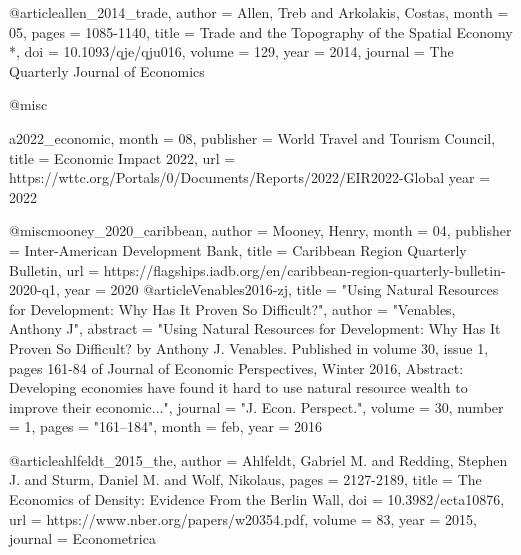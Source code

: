 @article{allen_2014_trade,
	author = {Allen, Treb and Arkolakis, Costas},
	month = {05},
	pages = {1085-1140},
	title = {Trade and the Topography of the Spatial Economy
		*},
	doi = {10.1093/qje/qju016},
	volume = {129},
	year = {2014},
	journal = {The Quarterly Journal of Economics}
}

@misc{a2022_economic,
	month = {08},
	publisher = {World Travel and Tourism Council},
	title = {Economic Impact 2022},
	url = {https://wttc.org/Portals/0/Documents/Reports/2022/EIR2022-Global%
	year = {2022}
}

@misc{mooney_2020_caribbean,
	author = {Mooney, Henry},
	month = {04},
	publisher = {Inter-American Development Bank},
	title = {Caribbean Region Quarterly Bulletin},
	url = {https://flagships.iadb.org/en/caribbean-region-quarterly-bulletin-2020-q1},
	year = {2020}
}
@article{Venables2016-zj,
	title    = "Using Natural Resources for Development: Why Has It Proven So
	Difficult?",
	author   = "Venables, Anthony J",
	abstract = "Using Natural Resources for Development: Why Has It Proven So
	Difficult? by Anthony J. Venables. Published in volume 30, issue
	1, pages 161-84 of Journal of Economic Perspectives, Winter 2016,
	Abstract: Developing economies have found it hard to use natural
	resource wealth to improve their economic...",
	journal  = "J. Econ. Perspect.",
	volume   =  30,
	number   =  1,
	pages    = "161--184",
	month    =  feb,
	year     =  2016
}

@article{ahlfeldt_2015_the,
	author = {Ahlfeldt, Gabriel M. and Redding, Stephen J. and Sturm, Daniel M. and Wolf, Nikolaus},
	pages = {2127-2189},
	title = {The Economics of Density: Evidence From the Berlin Wall},
	doi = {10.3982/ecta10876},
	url = {https://www.nber.org/papers/w20354.pdf},
	volume = {83},
	year = {2015},
	journal = {Econometrica}
}

}

